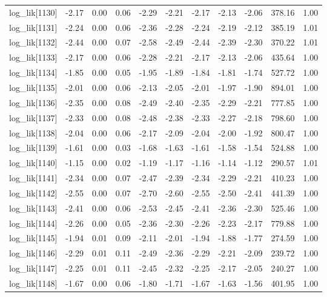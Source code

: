 \begin{table}[ht]
\begin{tabular}{rrrrrrrrrrr}
  log\_lik[1130] & -2.17 & 0.00 & 0.06 & -2.29 & -2.21 & -2.17 & -2.13 & -2.06 & 378.16 & 1.00 \\ 
  log\_lik[1131] & -2.24 & 0.00 & 0.06 & -2.36 & -2.28 & -2.24 & -2.19 & -2.12 & 385.19 & 1.01 \\ 
  log\_lik[1132] & -2.44 & 0.00 & 0.07 & -2.58 & -2.49 & -2.44 & -2.39 & -2.30 & 370.22 & 1.01 \\ 
  log\_lik[1133] & -2.17 & 0.00 & 0.06 & -2.28 & -2.21 & -2.17 & -2.13 & -2.06 & 435.64 & 1.00 \\ 
  log\_lik[1134] & -1.85 & 0.00 & 0.05 & -1.95 & -1.89 & -1.84 & -1.81 & -1.74 & 527.72 & 1.00 \\ 
  log\_lik[1135] & -2.01 & 0.00 & 0.06 & -2.13 & -2.05 & -2.01 & -1.97 & -1.90 & 894.01 & 1.00 \\ 
  log\_lik[1136] & -2.35 & 0.00 & 0.08 & -2.49 & -2.40 & -2.35 & -2.29 & -2.21 & 777.85 & 1.00 \\ 
  log\_lik[1137] & -2.33 & 0.00 & 0.08 & -2.48 & -2.38 & -2.33 & -2.27 & -2.18 & 798.60 & 1.00 \\ 
  log\_lik[1138] & -2.04 & 0.00 & 0.06 & -2.17 & -2.09 & -2.04 & -2.00 & -1.92 & 800.47 & 1.00 \\ 
  log\_lik[1139] & -1.61 & 0.00 & 0.03 & -1.68 & -1.63 & -1.61 & -1.58 & -1.54 & 524.88 & 1.00 \\ 
  log\_lik[1140] & -1.15 & 0.00 & 0.02 & -1.19 & -1.17 & -1.16 & -1.14 & -1.12 & 290.57 & 1.01 \\ 
  log\_lik[1141] & -2.34 & 0.00 & 0.07 & -2.47 & -2.39 & -2.34 & -2.29 & -2.21 & 410.23 & 1.00 \\ 
  log\_lik[1142] & -2.55 & 0.00 & 0.07 & -2.70 & -2.60 & -2.55 & -2.50 & -2.41 & 441.39 & 1.00 \\ 
  log\_lik[1143] & -2.41 & 0.00 & 0.06 & -2.53 & -2.45 & -2.41 & -2.36 & -2.30 & 525.46 & 1.00 \\ 
  log\_lik[1144] & -2.26 & 0.00 & 0.05 & -2.36 & -2.30 & -2.26 & -2.23 & -2.17 & 779.88 & 1.00 \\ 
  log\_lik[1145] & -1.94 & 0.01 & 0.09 & -2.11 & -2.01 & -1.94 & -1.88 & -1.77 & 274.59 & 1.00 \\ 
  log\_lik[1146] & -2.29 & 0.01 & 0.11 & -2.49 & -2.36 & -2.29 & -2.21 & -2.09 & 239.72 & 1.00 \\ 
  log\_lik[1147] & -2.25 & 0.01 & 0.11 & -2.45 & -2.32 & -2.25 & -2.17 & -2.05 & 240.27 & 1.00 \\ 
  log\_lik[1148] & -1.67 & 0.00 & 0.06 & -1.80 & -1.71 & -1.67 & -1.63 & -1.56 & 401.95 & 1.00 \\ 

\end{tabular}
\end{table}
